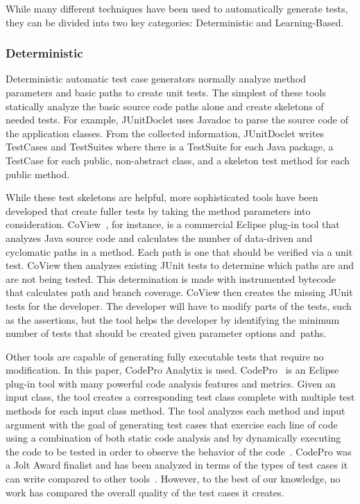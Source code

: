 While many different techniques have been used to automatically generate tests, they can be divided into two key categories: Deterministic and Learning-Based.

\subsubsection{Deterministic}

Deterministic automatic test case generators normally analyze method parameters and basic paths to create unit tests.  The simplest of these tools statically analyze the basic source code paths alone and create skeletons of  needed tests.  For example, JUnitDoclet \cite{JUnitDoclet} uses Javadoc to parse the source code of the application classes. From the collected information, JUnitDoclet writes TestCases and TestSuites where there is a TestSuite for each Java package, a TestCase for each public, non-abstract class, and a skeleton test method for each public method. %


While these test skeletons are helpful, more sophisticated tools have been developed that create fuller tests by taking the method parameters into consideration. CoView~\cite{CoView}, for instance, is a commercial Eclipse plug-in tool that analyzes Java source code and calculates the number of data-driven and cyclomatic paths in a method. Each path is one that should be verified via a unit test. CoView then analyzes existing JUnit tests to determine which paths are and are not being tested. This determination is made with instrumented bytecode that calculates path and branch coverage. CoView then creates the missing JUnit tests for the developer. The developer will have to modify parts of the tests, such as the assertions, but the tool helps the developer by identifying the minimum number of tests that should be created given parameter options \mbox{and paths}.

Other tools are capable of generating fully executable tests that require no modification.  In this paper, CodePro Analytix is used.  CodePro~\cite{CodePro1} is an Eclipse plug-in tool with many powerful code analysis features and metrics.  Given an input class, the tool creates a corresponding test class complete with multiple test methods for each input class method. The tool analyzes each method and input argument with the goal of generating test cases that exercise each line of code using a combination of both static code analysis and by dynamically executing the code to be tested in order to observe the behavior of the code~\cite{CodePro2}.  CodePro was a Jolt Award finalist and has been analyzed in terms of the types of test cases it can write compared to other tools~\cite{xie2009}.  However, to the best of our knowledge, no work has compared the overall quality of the test cases it creates.

